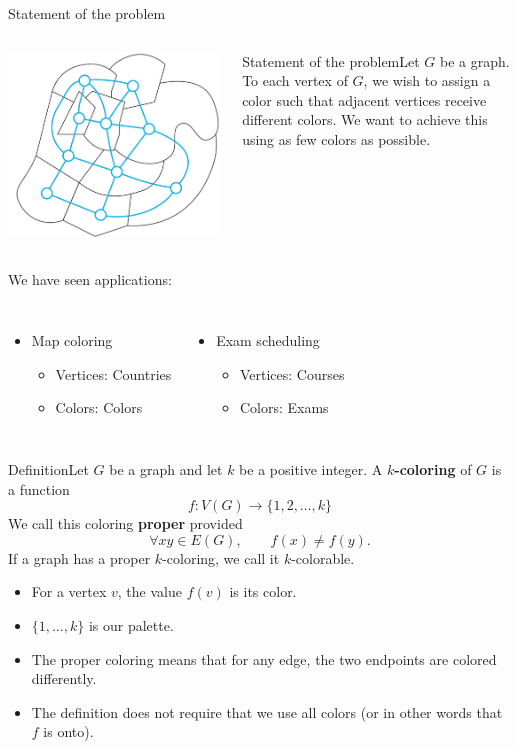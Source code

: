 \documentclass{beamer}
\def\bl[#1]#2{\begin{block}{#1}#2\end{block}}
\def\itemb{\begin{itemize}}
\def\iteme{\end{itemize}}
\begin{document}
\begin{frame}{Statement of the problem}
\begin{columns}
\includegraphics[scale=0.23]{MapColors.jpg}
\bl[Statement of the problem]{Let $G$ be a graph. To each vertex of $G$, we wish to assign a color such that adjacent vertices receive different colors. We want to achieve this using as few colors as possible.}
\end{columns}\vspace{0.5cm}
We have seen applications:
\begin{columns}
\itemb
\item Map coloring
\itemb
\item Vertices: Countries
\item Colors: Colors
\iteme
\iteme
{}
\itemb
\item Exam scheduling
\itemb
\item Vertices: Courses
\item Colors: Exams
\iteme
\iteme
\end{columns}
\end{frame}

\begin{frame}
\bl[Definition]{Let $G$ be a graph and let $k$ be a positive integer. A \textbf{$k$-coloring} of $G$ is a function
\[
f:V(G)\to\{1,2,\dots,k\}
\]
We call this coloring \textbf{proper} provided
\[
\forall xy\in E(G),\qquad f(x)\neq f(y).
\]
If a graph has a proper $k$-coloring, we call it $k$-colorable.}
\itemb
\item For a vertex $v$, the value $f(v)$ is its color.
\item $\{1,\dots, k\}$ is our palette.
\item The proper coloring means that for any edge, the two endpoints are colored differently.
\item The definition does not require that we use all colors (or in other words that $f$ is onto).
\iteme
\end{frame}
\end{document}
